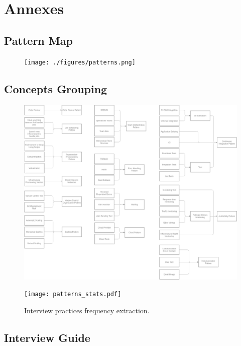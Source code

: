 \pagebreak
  \chapter{Annexes}
  \pagebreak

  \section{Pattern Map} \label{anex:pat:map}
    \begin{figure}[ht!]
        \texttt{[image: ./figures/patterns.png]}
    \end{figure}
\pagebreak
  \section{Concepts Grouping} \label{anex:pat:group}
    \begin{figure}[ht!]
        \includegraphics[width=1\linewidth]{./figures/concepts.png}
    \end{figure}
\pagebreak
\begin{landscape}
    \begin{figure}[ht!]
      \texttt{[image: patterns\_stats.pdf]}
      \caption{Interview practices frequency extraction.}
      \label{anex:pat:freq}
    \end{figure}
\end{landscape}

\pagebreak

  \section{Interview Guide} \label{anexes:interview}
